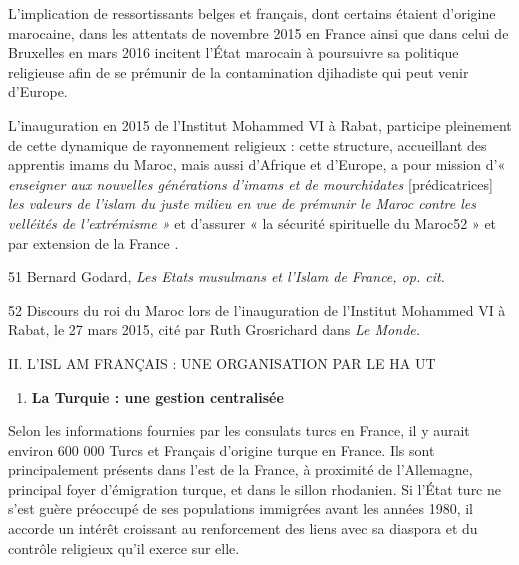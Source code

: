 L'implication de ressortissants belges et français, dont certains
étaient d'origine marocaine, dans les attentats de novembre 2015 en
France ainsi que dans celui de Bruxelles en mars 2016 incitent l'État
marocain à poursuivre sa politique religieuse afin de se prémunir de la
contamination djihadiste qui peut venir d'Europe.

L'inauguration en 2015 de l'Institut Mohammed VI à Rabat, participe
pleinement de cette dynamique de rayonnement religieux : cette
structure, accueillant des apprentis imams du Maroc, mais aussi
d'Afrique et d'Europe, a pour mission d'« \emph{enseigner aux nouvelles
générations d'imams et de mourchidates} {[}prédicatrices{]} \emph{les
valeurs de l'islam du juste milieu en vue de prémunir le Maroc contre
les velléités de l'extrémisme »} et d'assurer « la sécurité spirituelle
du Maroc52 » et par extension de la France .

51 Bernard Godard, \emph{Les Etats musulmans et l'Islam de France, op.
cit.}

52 Discours du roi du Maroc lors de l'inauguration de l'Institut
Mohammed VI à Rabat, le 27 mars 2015, cité par Ruth Grosrichard dans
\emph{Le Monde.}

II. L'ISL AM FRANÇAIS : UNE ORGANISATION PAR LE HA UT


\begin{enumerate}
\def\labelenumi{\arabic{enumi}.}
\setcounter{enumi}{2}
\item
  
  \textbf{La Turquie : une gestion centralisée}
  
\end{enumerate}


Selon les informations fournies par les consulats turcs en France, il y
aurait environ 600 000 Turcs et Français d'origine turque en France. Ils
sont principalement présents dans l'est de la France, à proximité de
l'Allemagne, principal foyer d'émigration turque, et dans le sillon
rhodanien. Si l'État turc ne s'est guère préoccupé de ses populations
immigrées avant les années 1980, il accorde un intérêt croissant au
renforcement des liens avec sa diaspora et du contrôle religieux qu'il
exerce sur elle.

